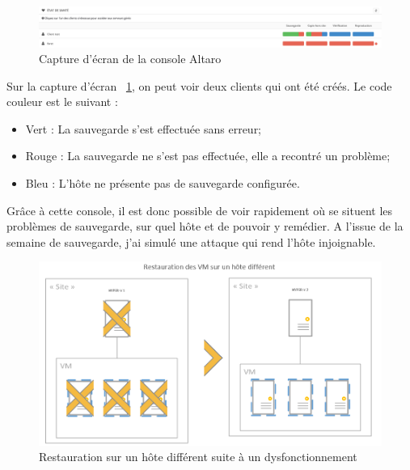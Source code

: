 \documentclass[pfe]{tnreport} %
\begin{document}
\begin{figure}[ht]
 \centering
 \includegraphics[width=15cm]{figures/etat sauvegarde.png}
 \caption{Capture d'écran de la console Altaro}
 \label{fig:altaro console}
\end{figure}
Sur la capture d'écran ~\ref{fig:altaro console}, on peut voir deux clients qui ont été créés. Le code couleur est le suivant : \newline
\begin{itemize}
 \item Vert : La sauvegarde s'est effectuée sans erreur;
 \item Rouge : La sauvegarde ne s'est pas effectuée, elle a recontré un problème;
 \item Bleu : L'hôte ne présente pas de sauvegarde configurée. \newline
\end{itemize}
Grâce à cette console, il est donc possible de voir rapidement où se situent les problèmes de sauvegarde, sur quel hôte et de pouvoir y remédier. \newline
A l'issue de la semaine de sauvegarde, j'ai simulé une attaque qui rend l'hôte injoignable. \newline

\begin{figure}[ht]
 \centering
 \includegraphics[width=15cm]{figures/restauration.png}
 \caption{Restauration sur un hôte différent suite à un dysfonctionnement}
 \label{fig:restau}
\end{figure}
\end{document}
